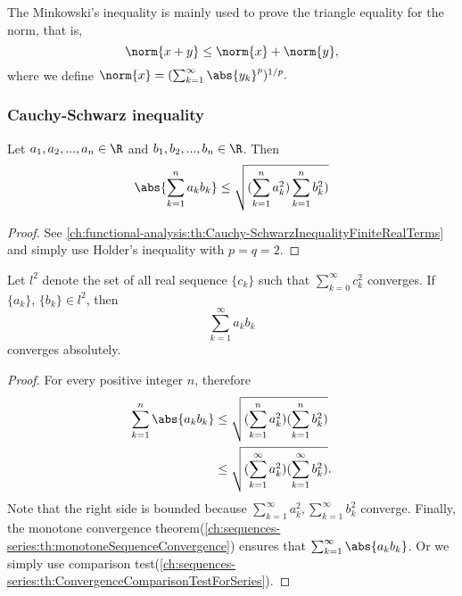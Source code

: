 \begin{refsection}
\begin{remark}
The Minkowski's inequality is mainly used to prove the triangle equality for the norm, that is, 
$$\norm{x + y} \leq \norm{x} + \norm{y},$$
where we define $\norm{x} = (\sum_{k=1}^\infty\abs{y_k}^p)^{1/p}.$
	
	
\end{remark}


\subsubsection{Cauchy-Schwarz inequality}

\begin{lemma}\cite[120]{johnsonbaugh2010foundations} Let $a_1,a_2,...,a_n \in \R$ and $b_1,b_2,...,b_n \in \R$. Then 
	$$\abs{\sum_{k=1}^n a_kb_k} \leq \sqrt{(\sum_{k=1}^n a_k^2)\sum_{k=1}^n b_k^2)}$$
\end{lemma}
\begin{proof}
See \autoref{ch:functional-analysis:th:Cauchy-SchwarzInequalityFiniteRealTerms} and simply use Holder's inequality with $p = q = 2$.
\end{proof}


\begin{lemma}\cite[123]{johnsonbaugh2010foundations}
Let $l^2$ denote the set of all real sequence $\{c_k\}$ such that $\sum_{k=0}^\infty c_k^2$ converges. If $\{a_k\}$, $\{b_k\} \in l^2$, then $$\sum_{k=1}^\infty a_kb_k$$
converges absolutely. 	
\end{lemma}
\begin{proof}
For every positive integer $n$, therefore
\begin{align*}
\sum_{k=1}^n \abs{a_kb_k} &\leq \sqrt{(\sum_{k=1}^n a_k^2)(\sum_{k=1}^n b_k^2)} \\
&\leq \sqrt{(\sum_{k=1}^\infty a_k^2)(\sum_{k=1}^\infty b_k^2)}.
\end{align*}
Note that the right side is bounded because $\sum_{k=1}^\infty a_k^2,\sum_{k=1}^\infty b_k^2$ converge. Finally, the monotone convergence theorem(\autoref{ch:sequences-series:th:monotoneSequenceConvergence}) ensures that $\sum_{k=1}^\infty \abs{a_kb_k}$. Or we simply use comparison test(\autoref{ch:sequences-series:th:ConvergenceComparisonTestForSeries}).
\end{proof}




\end{refsection}
